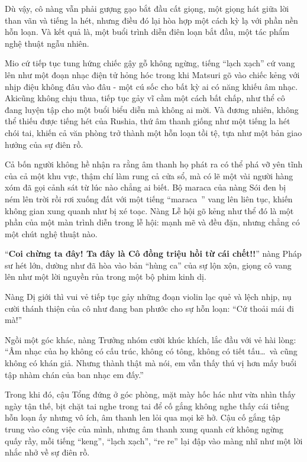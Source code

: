 \documentclass[../main.tex]{subfiles}
\begin{document}
Dù vậy, cô nàng vẫn phải gượng gạo bắt đầu cất giọng, một giọng hát giữa lời than vãn và tiếng la hét, nhưng điều đó lại hòa hợp một cách kỳ lạ với phần nền hỗn loạn. Và kết quả là, một buổi trình diễn điên loạn bắt đầu, một tác phẩm nghệ thuật ngẫu nhiên.


Mio cứ tiếp tục tung hứng chiếc gậy gỗ không ngừng, tiếng ``lạch xạch'' cứ vang lên như một đoạn nhạc điện tử hỏng hóc trong khi Matsuri gõ vào chiếc kẻng với nhịp điệu không đâu vào đâu - một cú sốc cho bất kỳ ai có năng khiếu âm nhạc. Akicũng không chịu thua, tiếp tục gảy vĩ cầm một cách bất chấp, như thể cô đang luyện tập cho một buổi biểu diễn mà không ai mời. Và đương nhiên, không thể thiếu được tiếng hét của Rushia, thứ âm thanh giống như một tiếng la hét chói tai, khiến cả văn phòng trở thành một hỗn loạn tồi tệ, tựa như một bản giao hưởng của sự điên rồ.

Cả bốn người không hề nhận ra rằng âm thanh họ phát ra có thể phá vỡ yên tĩnh của cả một khu vực, thậm chí làm rung cả cửa sổ, mà có lẽ một vài người hàng xóm đã gọi cảnh sát từ lúc nào chẳng ai biết. Bộ maraca của nàng Sói đen bị ném lên trời rồi rơi xuống đất với một tiếng ``maraca~{}'' vang lên liên tục, khiến không gian xung quanh như bị xé toạc. Nàng Lễ hội gõ kẻng như thể đó là một phần của một màn trình diễn trong lễ hội: mạnh mẽ và đều đặn, nhưng chẳng có một chút nghệ thuật nào.

``\textbf{Coi chừng ta đây! Ta đây là Cô đồng triệu hồi từ cái chết!!}'' nàng Pháp sư hét lớn, dường như đã hòa vào bản ``hùng ca'' của sự lộn xộn, giọng cô vang lên như một lời nguyền rủa trong một bộ phim kinh dị.

Nàng Dị giới thì vui vẻ tiếp tục gảy những đoạn violin lạc quẻ và lệch nhịp, nụ cười thánh thiện của cô như đang ban phước cho sự hỗn loạn: ``Cứ thoải mái đi mà!''

Ngồi một góc khác, nàng Trưởng nhóm cười khúc khích, lắc đầu với vẻ hài lòng: ``Âm nhạc của họ không có cấu trúc, không có tông, không có tiết tấu\dots\ và cũng không có khán giả. Nhưng thành thật mà nói, em vẫn thấy thú vị hơn mấy buổi tập nhàm chán của ban nhạc em đấy.''

Trong khi đó, cậu Tổng đứng ở góc phòng, mặt mày hốc hác như vừa nhìn thấy ngày tận thế, bịt chặt tai nghe trong tai để cố gắng không nghe thấy cái tiếng hỗn loạn ấy nhưng vô ích, âm thanh len lỏi qua mọi kẽ hở. Cậu cố gắng tập trung vào công việc của mình, nhưng âm thanh xung quanh cứ không ngừng quấy rầy, mỗi tiếng ``keng'', ``lạch xạch'', ``re re'' lại đập vào màng nhĩ như một lời nhắc nhở về sự điên rồ.
\end{document}
